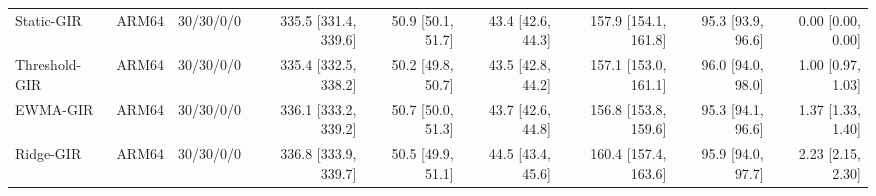 \begin{table}[t]
{\begin{tabular}{@{}llrrrrrrr@{}}
    Static-GIR & ARM64 & 30/30/0/0 & 335.5 [331.4, 339.6] & 50.9 [50.1, 51.7] & 43.4 [42.6, 44.3] & 157.9 [154.1, 161.8] & 95.3 [93.9, 96.6] & 0.00 [0.00, 0.00] \\
    Threshold-GIR & ARM64 & 30/30/0/0 & 335.4 [332.5, 338.2] & 50.2 [49.8, 50.7] & 43.5 [42.8, 44.2] & 157.1 [153.0, 161.1] & 96.0 [94.0, 98.0] & 1.00 [0.97, 1.03] \\
    EWMA-GIR & ARM64 & 30/30/0/0 & 336.1 [333.2, 339.2] & 50.7 [50.0, 51.3] & 43.7 [42.6, 44.8] & 156.8 [153.8, 159.6] & 95.3 [94.1, 96.6] & 1.37 [1.33, 1.40] \\
    Ridge-GIR & ARM64 & 30/30/0/0 & 336.8 [333.9, 339.7] & 50.5 [49.9, 51.1] & 44.5 [43.4, 45.6] & 160.4 [157.4, 163.6] & 95.9 [94.0, 97.7] & 2.23 [2.15, 2.30] \\
    \bottomrule
  \end{tabular}}
\end{table}

